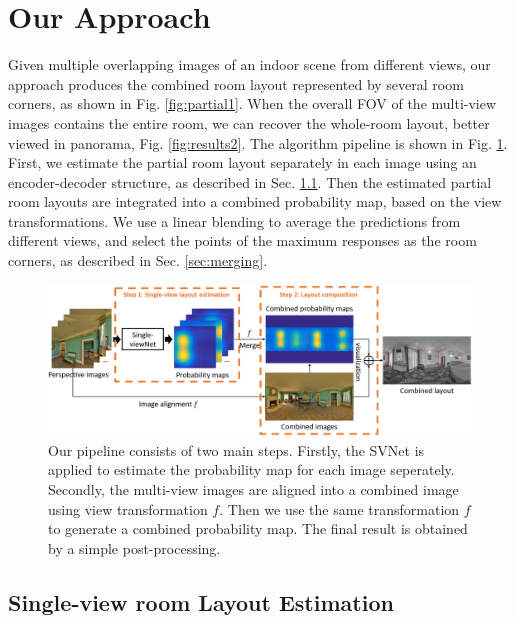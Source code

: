 \section{Our Approach}
Given multiple overlapping images of an indoor scene from different views, our approach produces the combined room layout represented by several room corners, as shown in Fig. \ref{fig:partial1}. When the overall FOV of the multi-view images contains the entire room, we can recover the whole-room layout, better viewed in panorama, Fig. \ref{fig:results2}. 
%
The algorithm pipeline is shown in Fig. \ref{fig:overview}. First, we estimate the partial room layout separately in each image using an encoder-decoder structure, as described in Sec. \ref{sec:layout}. Then the estimated partial room layouts are integrated into a combined probability map, based on the view transformations. 
We  use a linear blending to average the predictions from different views, and select the points of the maximum responses as the room corners, as described in Sec. \ref{sec:merging}. 


\begin{figure}[ht]
	\centering
	\includegraphics[width=\linewidth]{figs/ppline.png}
	\caption{Our pipeline consists of two main steps. Firstly, the SVNet is applied to estimate the probability map for each image seperately. Secondly, the multi-view images are aligned into a combined image using view transformation $f$. Then we use the same transformation $f$ to generate a combined probability map. The final result is obtained by a simple post-processing. }
	\label{fig:overview}
\end{figure}

\subsection{Single-view room Layout Estimation}
\label{sec:layout}

